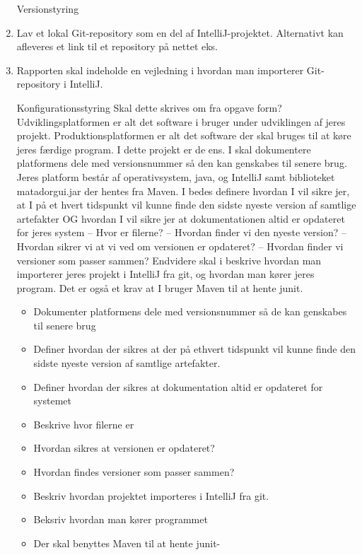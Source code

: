 \documentclass[../main.tex]{subfiles}
\begin{document}
\begin{enumerate}
    \hfill
    
{\Large Versionstyring}
    \item Lav et lokal Git-repository som en del af IntelliJ-projektet. Alternativt kan afleveres et link til et repository på nettet eks. 
    \item Rapporten skal indeholde en vejledning i hvordan man importerer Git-repository i IntelliJ.
    
    
    \newpage
    
{\Large Konfigurationsstyring} \newline
\todo Skal dette skrives om fra opgave form? \\
Udviklingsplatformen er alt det software i bruger under udviklingen af jeres projekt. Produktionsplatformen er alt det software der skal bruges til at køre jeres færdige program. I dette projekt er de ens. I skal dokumentere platformens dele med versionsnummer så den kan genskabes til senere brug. Jeres platform består af operativsystem, java, og IntelliJ samt biblioteket matadorgui.jar der hentes fra Maven.
I bedes definere hvordan I vil sikre jer, at I på et hvert tidspunkt vil kunne
finde den sidste nyeste version af samtlige artefakter OG hvordan I vil
sikre jer at dokumentationen altid er opdateret for jeres system
– Hvor er filerne?
– Hvordan finder vi den nyeste version?
– Hvordan sikrer vi at vi ved om versionen er opdateret?
– Hvordan finder vi versioner som passer sammen?
Endvidere skal i beskrive hvordan man importerer jeres projekt i IntelliJ fra git, og hvordan man kører jeres program.
Det er også et krav at I bruger Maven til at hente junit.

\begin{itemize}
    \item Dokumenter platformens dele med versionsnummer så de kan genskabes til senere brug
    \item Definer hvordan der sikres at der på ethvert tidspunkt vil kunne finde den sidste nyeste version af samtlige artefakter.
    \item Definer hvordan der sikres at dokumentation altid er opdateret for systemet
    \item Beskrive hvor filerne er
    \item Hvordan sikres at versionen er opdateret?
    \item Hvordan findes versioner som passer sammen?
    \item Beskriv hvordan projektet importeres i IntelliJ fra git.
    \item Beksriv hvordan man kører programmet
    \item Der skal benyttes Maven til at hente junit-
\end{itemize}

\end{enumerate}
\end{document}
